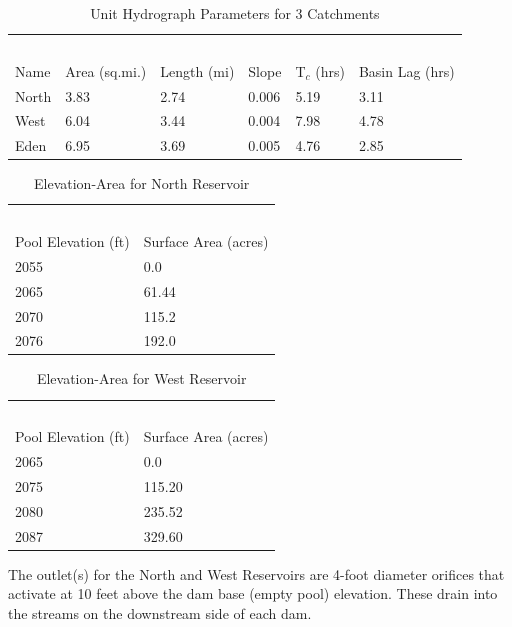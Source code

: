 \documentclass[12pt]{article}
\begin{document}
\begin{enumerate}
\begin{table}[h!]
\centering
\caption{Unit Hydrograph Parameters for 3 Catchments}
\begin{tabular}{p{1.0in}p{1.0in}p{1.0in}p{0.7in}p{0.7in}p{1.6in}} %
~&~\\
Name & Area (sq.mi.) & Length (mi) & Slope & T$_c$ (hrs) & Basin Lag (hrs)\\
\hline
\hline
North & 3.83& 2.74& 0.006& 5.19& 3.11\\
West & 6.04& 3.44& 0.004& 7.98& 4.78\\
Eden & 6.95& 3.69& 0.005& 4.76& 2.85\\
\hline
\end{tabular}
\label{tab:UH_hardin}
\end{table}

\begin{table}[h!]
\centering
\caption{Elevation-Area for North Reservoir}
\begin{tabular}{p{2.0in}p{2.0in}} %
~&~\\
Pool Elevation (ft) & Surface Area (acres) \\
\hline
\hline
2055 & 0.0\\
2065 & 61.44\\
2070 & 115.2\\
2076 & 192.0\\
\hline
\end{tabular}
\label{tab:EA_North}
\end{table}

\begin{table}[h!]
\centering
\caption{Elevation-Area for West Reservoir}
\begin{tabular}{p{2.0in}p{2.0in}} %
~&~\\
Pool Elevation (ft) & Surface Area (acres) \\
\hline
\hline
2065 & 0.0\\
2075 & 115.20\\
2080 & 235.52\\
2087 & 329.60\\
\hline
\end{tabular}
\label{tab:EA_West}
\end{table}

The outlet(s) for the North and West Reservoirs are 4-foot diameter orifices that activate at 10 feet above the dam base (empty pool) elevation.  These drain into the streams on the downstream side of each dam.


\end{enumerate}
\end{document}
